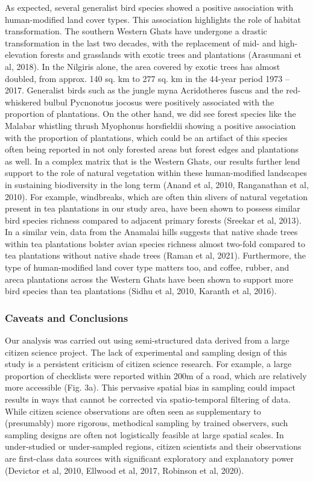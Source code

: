 As expected, several generalist bird species showed a positive association with human-modified land cover types.
This association highlights the role of habitat transformation.
The southern Western Ghats have undergone a drastic transformation in the last two decades, with the replacement of mid- and high-elevation forests and grasslands with exotic trees and plantations (Arasumani et al, 2018).
In the Nilgiris alone, the area covered by exotic trees has almost doubled, from approx.
140 sq. km to 277 sq. km in the 44-year period 1973 -- 2017.
Generalist birds such as the jungle myna Acridotheres fuscus and the red-whiskered bulbul Pycnonotus jocosus were positively associated with the proportion of plantations.
On the other hand, we did see forest species like the Malabar whistling thrush Myophonus horsfieldii showing a positive association with the proportion of plantations, which could be an artifact of this species often being reported in not only forested areas but forest edges and plantations as well.
In a complex matrix that is the Western Ghats, our results further lend support to the role of natural vegetation within these human-modified landscapes in sustaining biodiversity in the long term (Anand et al, 2010, Ranganathan et al, 2010).
For example, windbreaks, which are often thin slivers of natural vegetation present in tea plantations in our study area, have been shown to possess similar bird species richness compared to adjacent primary forests (Sreekar et al, 2013).
In a similar vein, data from the Anamalai hills suggests that native shade trees within tea plantations bolster avian species richness almost two-fold compared to tea plantations without native shade trees (Raman et al, 2021).
Furthermore, the type of human-modified land cover type matters too, and coffee, rubber, and areca plantations across the Western Ghats have been shown to support more bird species than tea plantations (Sidhu et al, 2010, Karanth et al, 2016).

\subsubsection*{Caveats and Conclusions}

Our analysis was carried out using semi-structured data derived from a large citizen science project.
The lack of experimental and sampling design of this study is a persistent criticism of citizen science research.
For example, a large proportion of checklists were reported within 200m of a road, which are relatively more accessible (Fig. 3a).
This pervasive spatial bias in sampling could impact results in ways that cannot be corrected via spatio-temporal filtering of data.
While citizen science observations are often seen as supplementary to (presumably) more rigorous, methodical sampling by trained observers, such sampling designs are often not logistically feasible at large spatial scales.
In under-studied or under-sampled regions, citizen scientists and their observations are first-class data sources with significant exploratory and explanatory power (Devictor et al, 2010, Ellwood et al, 2017, Robinson et al, 2020).

